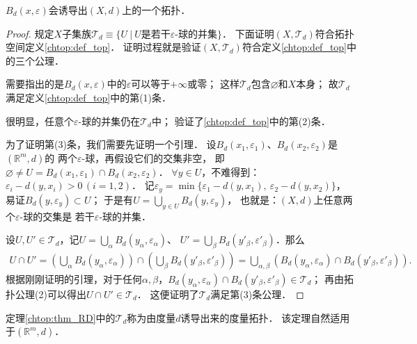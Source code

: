 \begin{theorem}\label{chtop:thm_RD}
    $B_{d}(x,\varepsilon)$会诱导出$(X,d)$上的一个拓扑．
\end{theorem}
\begin{proof}
    规定$X$子集族$\mathscr{T}_d \equiv \{
    U\ |\ U \text{是若干$\varepsilon$-球的并集}\}$．
    下面证明$(X, \mathscr{T}_d)$符合拓扑空间定义\ref{chtop:def_top}．
    证明过程就是验证$(X, \mathscr{T}_d)$符合定义\ref{chtop:def_top}中的三个公理．
    
    需要指出的是$B_{d}(x,\varepsilon)$中的$\varepsilon$可以等于$+\infty$或零；
    这样$\mathscr{T}_d$包含$\varnothing$和$X$本身；
    故$\mathscr{T}_d$满足定义\ref{chtop:def_top}中的第(1)条．
    
    很明显，任意个$\varepsilon$-球的并集仍在$\mathscr{T}_d$中；
    验证了\ref{chtop:def_top}中的第(2)条．
    
    为了证明第(3)条，我们需要先证明一个引理．
    设$B_{d}(x_1,\varepsilon_1)$、$B_{d}(x_2,\varepsilon_2)$是$(\mathbb{R}^m,d)$的
    两个$\varepsilon$-球，再假设它们的交集非空，
    即$\varnothing\neq U= B_{d}(x_1,\varepsilon_1)\cap B_{d}(x_2,\varepsilon_2)$．
    $\forall y \in U$，不难得到：$\varepsilon_i - d(y,x_i) >0 \, (i=1,2)$．
    记$\varepsilon_y= \min \{\varepsilon_1 - d(y,x_1),\ \varepsilon_2 - d(y,x_2)\}$，
    易证$B_{d}(y,\varepsilon_y)\subset U$；
    于是有$U = \bigcup_{y\in U} B_{d}(y,\varepsilon_y)$，
    也就是：{\kaishu $(X,d)$上任意两个$\varepsilon$-球的交集是
        若干$\varepsilon$-球的并集．}
    
    设$U,U'\in \mathscr{T}_d$，记$U= \bigcup_{\alpha} B_{d}(y_\alpha,\varepsilon_\alpha)$、
    $U'= \bigcup_{\beta} B_{d}(y'_\beta,\varepsilon'_\beta)$．那么
    \begin{align*}
        U \cap U' = \left( \bigcup_{\alpha} B_{d}(y_\alpha,\varepsilon_\alpha) \right)
        \cap \left( \bigcup_{\beta} B_{d}(y'_\beta,\varepsilon'_\beta) \right)
        = \bigcup_{\alpha,\beta }\left( B_{d}(y_\alpha,\varepsilon_\alpha)
        \cap B_{d}(y'_\beta,\varepsilon'_\beta) \right).
    \end{align*}
    根据刚刚证明的引理，对于任何$\alpha,\beta$，$B_{d}(y_\alpha,\varepsilon_\alpha)
    \cap B_{d}(y'_\beta,\varepsilon'_\beta) \in \mathscr{T}_d$；
    再由拓扑公理(2)可以得出$U\cap U'\in \mathscr{T}_d$．
    这便证明了$\mathscr{T}_d$满足第(3)条公理．
\end{proof}

定理\ref{chtop:thm_RD}中的$\mathscr{T}_d$称为由度量$d$诱导出来的{\heiti 度量拓扑}．
该定理自然适用于$(\mathbb{R}^m,d)$．


